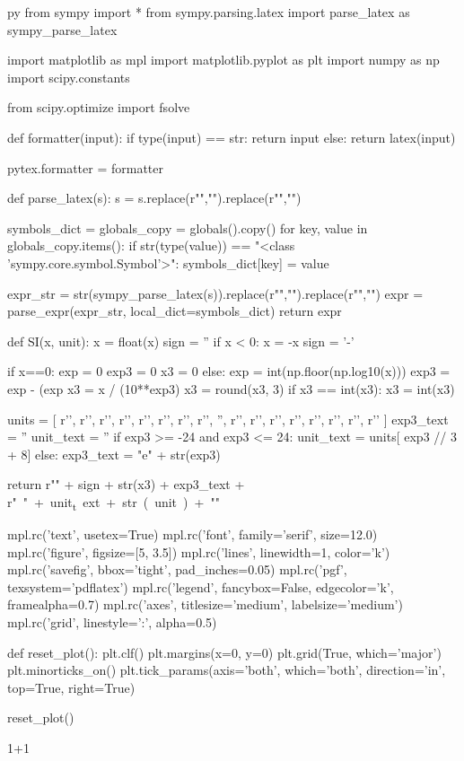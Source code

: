 \begin{pythontexcustomcode}[begin]{py}
from sympy import *
from sympy.parsing.latex import parse_latex as sympy_parse_latex

import matplotlib as mpl
import matplotlib.pyplot as plt
import numpy as np
import scipy.constants

from scipy.optimize import fsolve

def formatter(input):
	if type(input) == str:
		return input
	else:
		return latex(input)

pytex.formatter = formatter

def parse_latex(s):
	s = s.replace(r"\left","").replace(r"\right","")

	symbols_dict = {}
	globals_copy = globals().copy()
	for key, value in globals_copy.items():
		if str(type(value)) == "<class 'sympy.core.symbol.Symbol'>":
			symbols_dict[key] = value 

	expr_str = str(sympy_parse_latex(s)).replace(r"{","").replace(r"}","")
	expr = parse_expr(expr_str, local_dict=symbols_dict)
	return expr

def SI(x, unit):
	x = float(x)
	sign = ''
	if x < 0:
		x = -x
		sign = '-'

	if x==0:
		exp = 0
		exp3 = 0
		x3 = 0
	else:
		exp = int(np.floor(np.log10(x)))
		exp3 = exp - (exp %
		x3 = x / (10**exp3)
		x3 = round(x3, 3)
		if x3 == int(x3):
			x3 = int(x3)

	units = [
		r'\yocto ',
		r'\zepto ',
		r'\atto ',
		r'\femto ',
		r'\pico ',
		r'\nano ',
		r'\micro ',
		r'\milli ',
		'',
		r'\kilo ',
		r'\mega ',
		r'\giga ',
		r'\tera ',
		r'\peta ',
		r'\exa ',
		r'\zetta ',
		r'\yotta '
	]
	exp3_text = ''
	unit_text = ''
	if exp3 >= -24 and exp3 <= 24:
		unit_text = units[ exp3 // 3 + 8]
	else:
		exp3_text = "e" + str(exp3)

	return r"\SI{" + sign + str(x3) + exp3_text + r"}{" + unit_text + str(unit) + "}"

mpl.rc('text', usetex=True)
mpl.rc('font', family='serif', size=12.0)
mpl.rc('figure', figsize=[5, 3.5])
mpl.rc('lines', linewidth=1, color='k')
mpl.rc('savefig', bbox='tight', pad_inches=0.05)
mpl.rc('pgf', texsystem='pdflatex')
mpl.rc('legend', fancybox=False, edgecolor='k', framealpha=0.7)
mpl.rc('axes', titlesize='medium', labelsize='medium')
mpl.rc('grid', linestyle=':', alpha=0.5)

def reset_plot():
	plt.clf()
	plt.margins(x=0, y=0)
	plt.grid(True, which='major')
	plt.minorticks_on()
	plt.tick_params(axis='both', which='both', direction='in', top=True, right=True)

reset_plot()
\end{pythontexcustomcode}

\begin{pycode}
1+1
\end{pycode}
